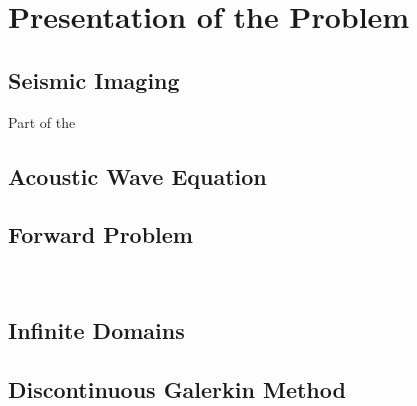 \newpage
\section{Presentation of the Problem}

\subsection{Seismic Imaging}

Part of the 

\subsection{Acoustic Wave Equation}

\subsection{Forward Problem}

\

\subsection{Infinite Domains}

\subsection{Discontinuous Galerkin Method}





